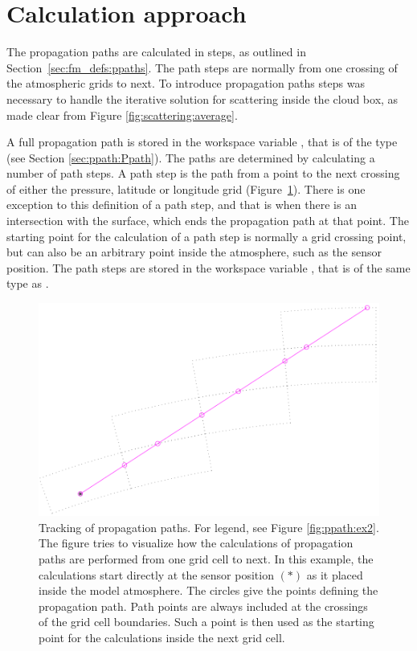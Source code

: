 \section{Calculation approach}
\label{sec:ppath:approach}

The propagation paths are calculated in steps, as outlined in
Section~\ref{sec:fm_defs:ppaths}. The path steps are normally from one crossing
of the atmospheric grids to next. To introduce
propagation paths steps was necessary to handle the iterative solution for
scattering inside the cloud box, as made clear from Figure
\ref{fig:scattering:average}.

A full propagation path is stored in the workspace variable ,
that is of the type  (see Section \ref{sec:ppath:Ppath}). The
paths are determined by calculating a number of path steps. A path step is the
path from a point to the next crossing of either the pressure, latitude or
longitude grid (Figure~\ref{fig:ppath:ex1}). There is one exception to this
definition of a path step, and that is when there is an intersection with the
surface, which ends the propagation path at that point. The starting point for
the calculation of a path step is normally a grid crossing point, but can also
be an arbitrary point inside the atmosphere, such as the sensor position. The
path steps are stored in the workspace variable , that is
of the same type as .

\begin{figure}
 \begin{center}
  \includegraphics*[width=0.80\hsize]{ppath_ex1}
  \caption{Tracking of propagation paths. For legend, see 
    Figure \ref{fig:ppath:ex2}. The figure tries to visualize how the
    calculations of propagation paths are performed from one grid cell
    to next. In this example, the calculations start directly at the
    sensor position $(\ast)$ as it placed inside the model
    atmosphere. The circles give the points defining the propagation
    path. Path points are always included at the crossings of the grid
    cell boundaries. Such a point is then used as the starting point
    for the calculations inside the next grid cell. }
  \label{fig:ppath:ex1}  
 \end{center}
\end{figure}

